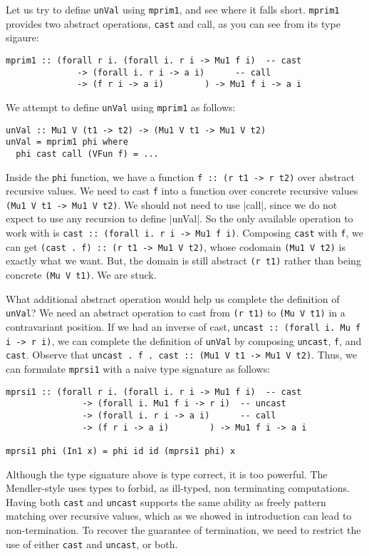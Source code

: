 \documentclass[a4paper,UKenglish]{lipics}
\begin{document}
Let us try to define \lstinline{unVal} using \lstinline{mprim1}, and see
where it falls short. \lstinline{mprim1} provides two abstract operations,
\lstinline{cast} and {call}, as you can see from its type sigaure:
\begin{lstlisting}
mprim1 :: (forall r i. (forall i. r i -> Mu1 f i)  -- cast
              -> (forall i. r i -> a i)      -- call
              -> (f r i -> a i)        ) -> Mu1 f i -> a i
\end{lstlisting}
We attempt to define \lstinline{unVal} using \lstinline{mprim1} as follows:
\begin{lstlisting}
unVal :: Mu1 V (t1 -> t2) -> (Mu1 V t1 -> Mu1 V t2)
unVal = mprim1 phi where
  phi cast call (VFun f) = ...
\end{lstlisting}
Inside the \lstinline{phi} function, we have a function
\lstinline{f :: (r t1 -> r t2)} over abstract recursive values.
We need to cast \lstinline{f} into a function over concrete recursive values
\lstinline{(Mu1 V t1 -> Mu1 V t2)}.
We should not need to use |call|, since we do not expect
to use any recursion to define |unVal|.
So the only available operation to
work with is \lstinline{cast :: (forall i. r i -> Mu1 f i)}.
Composing \lstinline{cast} with \lstinline{f}, we can get
\lstinline{(cast . f) :: (r t1 -> Mu1 V t2)}, whose codomain
\lstinline{(Mu1 V t2)} is exactly what we want. But, the domain
is still abstract \lstinline{(r t1)} rather than being concrete
\lstinline{(Mu V t1)}. We are stuck.

What additional abstract operation would help us complete
the definition of \lstinline{unVal}? We need an abstract operation
to cast from \lstinline{(r t1)} to \lstinline{(Mu V t1)}
in a contravariant position. If we had an inverse of cast,
\lstinline{uncast :: (forall i. Mu f i -> r i)}, we can
complete the definition of \lstinline{unVal} by composing
\lstinline{uncast}, \lstinline{f}, and \lstinline{cast}.
Observe that \lstinline{uncast . f . cast :: (Mu1 V t1 -> Mu1 V t2)}.
Thus, we can formulate \lstinline{mprsi1} with a naive type signature
as follows:
\begin{lstlisting}
mprsi1 :: (forall r i. (forall i. r i -> Mu1 f i)  -- cast
               -> (forall i. Mu1 f i -> r i)  -- uncast
               -> (forall i. r i -> a i)      -- call
               -> (f r i -> a i)        ) -> Mu1 f i -> a i

mprsi1 phi (In1 x) = phi id id (mprsi1 phi) x
\end{lstlisting}
Although the type signature above is type correct, it is too powerful.
The Mendler-style uses types to forbid, as ill-typed, non terminating
computations. Having both \lstinline{cast} and \lstinline{uncast} supports
the same ability as freely pattern matching over recursive values,
which as we showed in introduction can lead to non-termination.
To recover the guarantee of termination, we need to restrict the use of
either \lstinline{cast} and \lstinline{uncast}, or both.
\end{document}
